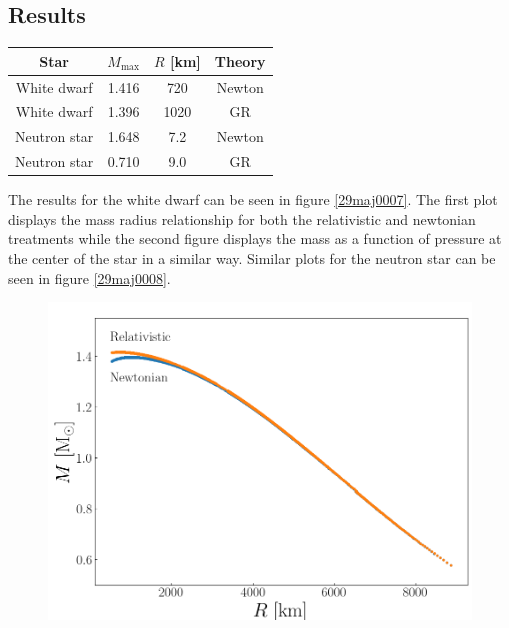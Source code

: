 \documentclass[twocolumn]{article}
\begin{document}
\begin{large}
\subsection*{Results}
\begin{table}[b]
\centering
\begin{tabular}{c c c c}
    Star & $M_\text{max}$ & $R$ [km] & Theory \\ 
    \hline\hline
    White dwarf  & 1.416 & 720  & Newton \\ 
    White dwarf  & 1.396 & 1020 & GR \\ 
    Neutron star & 1.648 & 7.2  & Newton \\ 
    Neutron star & 0.710 & 9.0  & GR \\ 
\end{tabular}
\end{table}
The results for the white dwarf can be seen in figure \ref{29maj0007}. The first plot displays the mass radius relationship for both the relativistic and newtonian treatments while the second figure displays the mass as a function of pressure at the center of the star in a similar way. Similar plots for the neutron star can be seen in figure \ref{29maj0008}.
\begin{figure}[!t]
    \begin{center}
        \includegraphics[scale=0.35]{WhiteDwarf_MR.png}

\end{center}
\end{figure}
\end{large}
\end{document}
